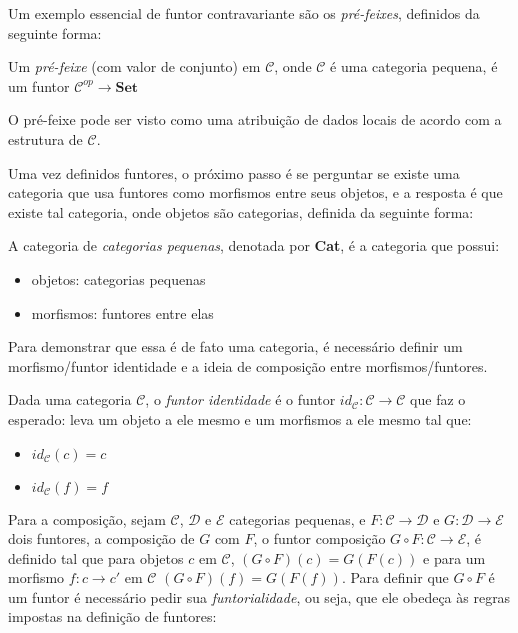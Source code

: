 \documentclass[../main.tex]{subfiles}
\begin{document}
Um exemplo essencial de funtor contravariante são os \emph{pré-feixes}, definidos da seguinte forma:

\begin{definition}
    Um \emph{pré-feixe} (com valor de conjunto) em $\mathcal{C}$, onde $\mathcal{C}$ é uma categoria pequena, é um funtor $\mathcal{C}^{op} \to \textbf{Set}$
\end{definition}


O pré-feixe pode ser visto como uma atribuição de dados locais de acordo com a estrutura de $\mathcal{C}$.

Uma vez definidos funtores, o próximo passo é se perguntar se existe uma categoria que usa funtores como morfismos entre seus objetos, e a resposta é que existe tal categoria, onde objetos são categorias, definida da seguinte forma:

\begin{definition}
    A categoria de \emph{categorias pequenas}, denotada por \textbf{Cat}, é a categoria que possui:
    \begin{itemize}
        \item objetos: categorias pequenas
        \item morfismos: funtores entre elas
    \end{itemize}
\end{definition}

Para demonstrar que essa é de fato uma categoria, é necessário definir um morfismo/funtor identidade e a ideia de composição entre morfismos/funtores.

\begin{definition}
    Dada uma categoria $\mathcal{C}$, o \emph{funtor identidade} é o funtor $id_{\mathcal{C}} : \mathcal{C} \to \mathcal{C}$ que faz o esperado: leva um objeto a ele mesmo e um morfismos a ele mesmo tal que:
    \begin{itemize}
        \item $id_{\mathcal{C}} (c) = c$
        \item $id_{\mathcal{C}} (f) = f$
    \end{itemize}
\end{definition}

Para a composição, sejam $\mathcal{C}$, $\mathcal{D}$ e $\mathcal{E}$ categorias pequenas, e $F : \mathcal{C} \to \mathcal{D}$ e $G : \mathcal{D} \to \mathcal{E}$ dois funtores, a composição de $G$ com $F$, o funtor composição $G \circ F : \mathcal{C} \to \mathcal{E}$, é definido tal que para objetos $c$ em $\mathcal{C}$, $(G \circ F) (c) = G(F(c))$ e para um morfismo $f : c \to c'$ em $\mathcal{C}$ $(G \circ F) (f) = G(F(f))$. Para definir que $G \circ F$ é um funtor é necessário pedir sua \emph{funtorialidade}, ou seja, que ele obedeça às regras impostas na definição de funtores:
\end{document}
